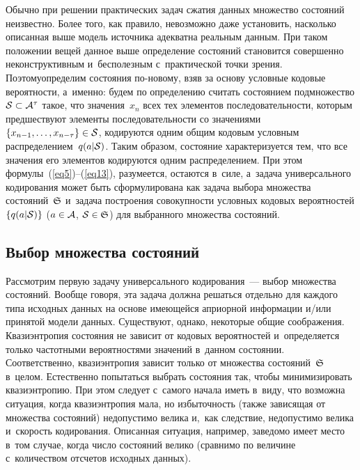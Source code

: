 \begin{multicols}{2}
Обычно при решении практических задач сжатия данных множество состояний неизвестно. 
Более того, как правило, невозможно даже установить, насколько описанная выше 
модель источника адекватна реальным данным. При таком положении вещей данное 
выше определение состояний становится совершенно неконструктивным и~бесполезным 
с~практической точки зрения. Поэтому\linebreak определим состояния по-но\-во\-му, 
взяв за основу условные кодовые вероятности, а~именно: будем по определению 
считать состоянием под\-мно\-жество ${\cal S}\hm\subset{\cal A}^\tau$ такое, 
что значения~$x_n$ всех тех элементов последовательности, которым 
пред\-шест\-ву\-ют элементы последовательности со значениями 
$\{x_{n-1},\ldots,x_{n-\tau}\}\in{\cal S}$, кодируются одним общим 
кодовым условным распределением~$q(a|{\cal S})$. Таким образом, состояние 
характеризуется тем, что все значения его элементов кодируются одним 
распределением. При этом формулы~(\ref{eq5})--(\ref{eq13}), разумеется, 
остаются в~силе, а~задача универсального кодирования может быть сформулирована 
как задача выбора множества состояний~${\frak S}$ и~задача построения совокупности 
условных кодовых вероятностей $\{q(a|{\cal S})\}$ 
($a\hm\in{\cal A}$, ${\cal S}\hm\in{\frak S}$) для выбранного множества со\-сто\-яний.

\vspace*{-9pt}

\subsection{Выбор множества состояний}

Рассмотрим первую задачу универсального кодирования~--- выбор множества состояний. 
Вообще говоря, эта задача должна решаться отдельно для каж\-до\-го типа исходных 
данных на основе имеющейся априорной информации и/или принятой модели данных. 
Существуют, однако, некоторые общие соображения. Квазиэнтропия состояния не 
зависит от кодовых вероятностей и~определяется только частотными вероятностями 
значений в~данном состоянии. Соответственно, квазиэнтропия зависит только от 
множества состояний~${\frak S}$ в~целом. Естественно попытаться выбрать состояния 
так, чтобы минимизировать квазиэнтропию. При этом следует с~самого начала иметь в~виду, 
что возможна ситуация, когда квазиэнтропия мала, но избыточность (также зависящая 
от множества состояний) не\-до\-пус\-ти\-мо велика и,~как следствие, недопустимо 
велика и~скорость кодирования. Описанная ситуация, например, заведомо имеет 
место в~том случае, когда число состояний велико (сравнимо по величине с~количеством 
отсчетов исходных данных).


\end{multicols}
